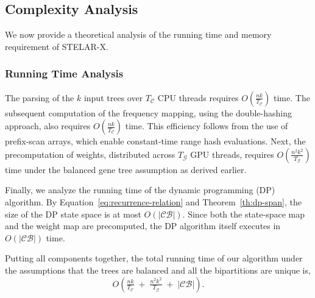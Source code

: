 \documentclass[10pt,a4paper]{article}
\begin{document}


\subsection{Complexity Analysis}
\label{subsec:complexity}

We now provide a theoretical analysis of the running time and memory requirement of STELAR-X. 

\subsubsection{Running Time Analysis}

The parsing of the $k$ input trees over $T_\mathcal{C}$ CPU threads requires $O\!\left(\tfrac{nk}{T_\mathcal{C}}\right)$ time. The subsequent computation of the frequency mapping, using the double-hashing approach, also requires $O\!\left(\tfrac{nk}{T_\mathcal{C}}\right)$ time. This efficiency follows from the use of prefix-scan arrays, which enable constant-time range hash evaluations. Next, the precomputation of weights, distributed across $T_\mathcal{G}$ GPU threads, requires $O\!\left(\tfrac{n^2k^2}{T_\mathcal{G}}\right)$ time under the balanced gene tree assumption as derived earlier. 

Finally, we analyze the running time of the dynamic programming (DP) algorithm. By Equation~\eqref{eq:recurrence-relation} and Theorem~\ref{th:dp-span}, the size of the DP state space is at most $O(|\mathcal{CB}|)$. Since both the state-space map and the weight map are precomputed, the DP algorithm itself executes in $O(|\mathcal{CB}|)$ time.  

Putting all components together, the total running time of our algorithm under the assumptions that the trees are balanced and all the bipartitions are unique is,
\[
O\!\left(
\tfrac{nk}{T_\mathcal{C}} \;+\;
\tfrac{n^2k^2}{T_\mathcal{G}} \;+\;
|\mathcal{CB}|
\right).
\]
\end{document}
